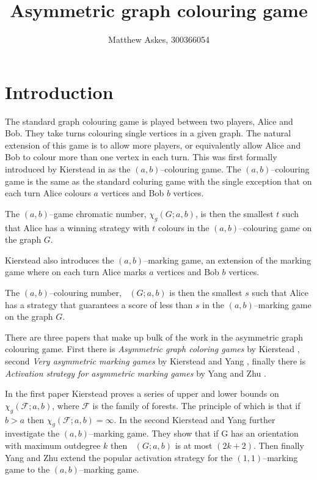 \documentclass[11pt]{article}
\title{Asymmetric graph colouring game}
\author{ Matthew Askes, 300366054}
\date{}
\numberwithin{figure}{section}
\theoremstyle{definition}
\newcommand{\FF}{\mathcal{F}} %
\DeclareMathOperator{\col}{col_g}
\begin{document}
   
    
    \maketitle
    
    \section{Introduction}
    
    The standard graph colouring game is played between two players, Alice and Bob. They take turns colouring single vertices in a given graph. The natural extension of this game is to allow more players, or equivalently allow Alice and Bob to colour more than one vertex in each turn. This was first formally introduced by Kierstead in \cite{kierstead2005} as the $(a,b)$--colouring game. The $(a,b)$--colouring game is the same as the standard coluring game with the single exception that on each turn Alice colours $a$ vertices and Bob $b$ vertices. 
    
    The $(a,b)$--game chromatic number, $\chi_g(G;a,b)$, is then the smallest $t$ such that Alice has a winning strategy with $t$ colours in the $(a,b)$--colouring game on the graph $G$.
        
    Kierstead also introduces the $(a,b)$--marking game, an extension of the marking game where  on each turn Alice marks $a$ vertices and Bob $b$ vertices. 
    
    The $(a,b)$--colouring number, $\col(G;a,b)$ is then the smallest $s$ such that Alice has a strategy that guarantees a score of less than $s$ in the $(a,b)$--marking game on the graph $G$.
    
    
    There are three papers that make up bulk of the work in the asymmetric graph colouring game. First there is \textit{Asymmetric graph coloring games} by Kierstead \cite{kierstead2005}, second \textit{Very asymmetric marking games} by Kierstead and Yang \cite{kierYang2005}, finally there is \textit{Activation strategy for asymmetric marking games} by Yang and Zhu \cite{yangZhu2008}.
    
    In the first paper Kierstead proves a series of upper and lower bounds on $\chi_g(\FF;a,b)$, where $\FF$ is the family of forests. The principle of which is that if $b>a$ then $\chi_g(\FF;a,b)=\infty$. In the second Kierstead and Yang further investigate the $(a,b)$--marking game. They show that if G has an orientation with maximum outdegree $k$ then $\col(G;a,b)$ is at most $(2k +
    2)$. Then finally Yang and Zhu extend the popular activation strategy for the $(1,1)$--marking game to the $(a,b)$--marking game.
    
\end{document}
